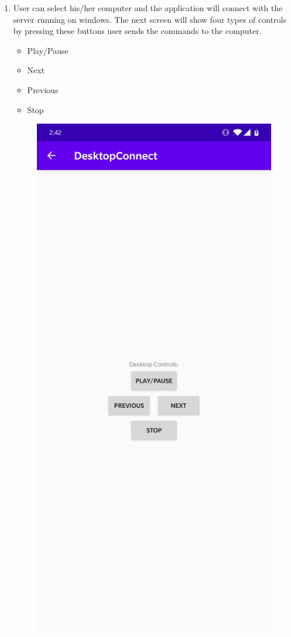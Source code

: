 \documentclass{article}
\begin{document}
\begin{enumerate}
\item User can select his/her computer and the application will connect with the server running on
windows. The next screen will show four types of controls by pressing these buttons user sends the
commands to the computer.
\begin{itemize}
\item Play/Pause
\item Next
\item Previous
\item Stop
\end{itemize}

\begin{figure}[h]
\centering
\includegraphics[scale=.07]{./control.jpg}
\end{figure}

\end{enumerate}
\end{document}

